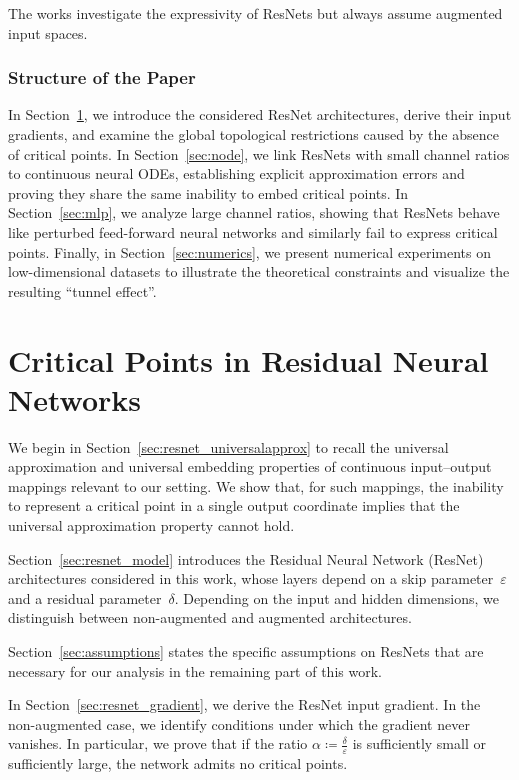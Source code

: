 \documentclass[10pt]{article}
\theoremstyle{definition}
\numberwithin{equation}{section}
\newcommand{\eps}{\varepsilon}
\begin{document}
   The works \cite{zhang20approx, LuPuWang2017expressive} investigate the expressivity of ResNets but always assume augmented input spaces.

\subsubsection*{Structure of the Paper}

In Section~\ref{sec:resnets}, we introduce the considered ResNet architectures, derive their input gradients, and examine the global topological restrictions caused by the absence of critical points. In Section~\ref{sec:node}, we link ResNets with small channel ratios to continuous neural ODEs, establishing explicit approximation errors and proving they share the same inability to embed critical points. In Section~\ref{sec:mlp}, we analyze large channel ratios, showing that ResNets behave like perturbed feed-forward neural networks and similarly fail to express critical points. Finally, in Section~\ref{sec:numerics}, we present numerical experiments on low-dimensional datasets to illustrate the theoretical constraints and visualize the resulting ``tunnel effect''.

\section{Critical Points in Residual Neural Networks}
\label{sec:resnets}

We begin in Section~\ref{sec:resnet_universalapprox} to recall the universal approximation and universal embedding properties of continuous input–output mappings relevant to our setting. We show that, for such mappings, the inability to represent a critical point in a single output coordinate implies that the universal approximation property cannot hold.

Section~\ref{sec:resnet_model} introduces the Residual Neural Network (ResNet) architectures considered in this work, whose layers depend on a skip parameter~$\eps$ and a residual parameter~$\delta$. Depending on the input and hidden dimensions, we distinguish between non-augmented and augmented architectures.

Section~\ref{sec:assumptions} states the specific assumptions on ResNets that are necessary for our analysis in the remaining part of this work.

In Section~\ref{sec:resnet_gradient}, we derive the ResNet input gradient. In the non-augmented case, we identify conditions under which the gradient never vanishes. In particular, we prove that if the ratio $\alpha \coloneqq \frac{\delta}{\eps}$ is sufficiently small or sufficiently large, the network admits no critical points.
\end{document}
